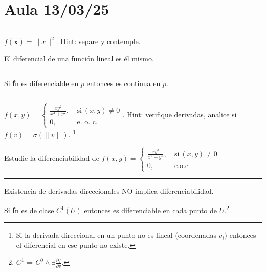 \section*{Aula 13/03/25}
\-\hrule 
\begin{example}
    \(f(\textbf{x}) = \|x\|^2\). Hint: separe y contemple. 
\end{example}
\begin{exercise}
    El diferencial de una función lineal es él mismo. 
\end{exercise}
\hrule

\vspace{0.2in}

\begin{proposition}
    Si \U{f}{n}{} es diferenciable en \(p\) entonces es continua en \(p\). 
\end{proposition}

\vspace{0.2in} 

\hrule 
\begin{example}
    \(\displaystyle f(x,y) = \begin{cases}
        \frac{xy^2}{x^2+y^2}, \ &\text{si} \ (x,y)\neq 0 \\
        0, \ &\text{e. o. c.}
    \end{cases}\). Hint: verifique derivadas, analice si \(f(v) = \sigma(\|v\|)\). \footnote{Si la derivada direccional en un punto no es lineal (coordenadas \(v_i\)) entonces el diferencial en ese punto no existe. }
\end{example}    
\begin{exercise}
    Estudie la diferenciabilidad de \(\displaystyle f(x,y) = \begin{cases}
        \frac{xy^3}{x^2+y^2}, \ &\text{si}\ (x,y)\neq 0 \\
        0, \ &\text{e.o.c}
    \end{cases}\)
\end{exercise}
\hrule 

\vspace{0.2in} 

\begin{note}
    Existencia de derivadas direccionales NO implica diferenciabilidad. 
\end{note}
\begin{theorem}
    Si \U{f}{n}{} es de clase \(C^1(U)\) entonces es diferenciable en cada punto de \(U\).\footnote{\(C^1 \Rightarrow C^0 \land \exists \frac{\partial f}{\partial v}\). }
\end{theorem}


